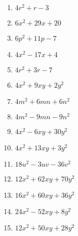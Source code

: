 \documentclass[12pt]{article}
\theoremstyle{definition}
\begin{document}
\begin{multicols}{3}
\begin{enumerate}
  \item $4 r^2 + r - 3$
  \item $6 x^2 + 29 x + 20$
  \item $6 p^2 + 11 p - 7$
  \item $4 x^2 - 17 x + 4$
  \item $4 r^2 + 3 r - 7$
  \item $4 x^2 + 9 x y + 2 y^2$
  \item $4 m^2 + 6 m n + 6 n^2$
  \item $4 m^2 - 9 m n - 9 n^2$
  \item $4 x^2 - 6 x y + 30 y^2$
  \item $4 x^2 + 13 x y + 3 y^2$
  \item $18 u^2 - 3 u v - 36 v^2$
  \item $12 x^2 + 62 x y + 70 y^2$
  \item $16 x^2 + 60 x y + 36 y^2$
  \item $24 x^2 - 52 x y + 8 y^2$
  \item $12 x^2 + 50 x y + 28 y^2$
	\end{enumerate}
\end{multicols}
\newpage
\end{document}
